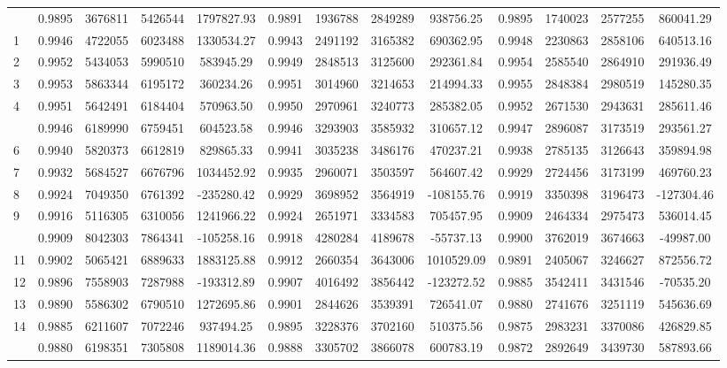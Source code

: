 \documentclass[
  12pt,
]{article}
\begin{document}
\begin{longtable}[t]{lcccccccccccc}
\endfoot
\bottomrule
\endlastfoot
0 & 0.9895 & 3676811 & 5426544 & 1797827.93 & 0.9891 & 1936788 & 2849289 & 938756.25 & 0.9895 & 1740023 & 2577255 & 860041.29\\
1 & 0.9946 & 4722055 & 6023488 & 1330534.27 & 0.9943 & 2491192 & 3165382 & 690362.95 & 0.9948 & 2230863 & 2858106 & 640513.16\\
2 & 0.9952 & 5434053 & 5990510 & 583945.29 & 0.9949 & 2848513 & 3125600 & 292361.84 & 0.9954 & 2585540 & 2864910 & 291936.49\\
3 & 0.9953 & 5863344 & 6195172 & 360234.26 & 0.9951 & 3014960 & 3214653 & 214994.33 & 0.9955 & 2848384 & 2980519 & 145280.35\\
4 & 0.9951 & 5642491 & 6184404 & 570963.50 & 0.9950 & 2970961 & 3240773 & 285382.05 & 0.9952 & 2671530 & 2943631 & 285611.46\\
\addlinespace
5 & 0.9946 & 6189990 & 6759451 & 604523.58 & 0.9946 & 3293903 & 3585932 & 310657.12 & 0.9947 & 2896087 & 3173519 & 293561.27\\
6 & 0.9940 & 5820373 & 6612819 & 829865.33 & 0.9941 & 3035238 & 3486176 & 470237.21 & 0.9938 & 2785135 & 3126643 & 359894.98\\
7 & 0.9932 & 5684527 & 6676796 & 1034452.92 & 0.9935 & 2960071 & 3503597 & 564607.42 & 0.9929 & 2724456 & 3173199 & 469760.23\\
8 & 0.9924 & 7049350 & 6761392 & -235280.42 & 0.9929 & 3698952 & 3564919 & -108155.76 & 0.9919 & 3350398 & 3196473 & -127304.46\\
9 & 0.9916 & 5116305 & 6310056 & 1241966.22 & 0.9924 & 2651971 & 3334583 & 705457.95 & 0.9909 & 2464334 & 2975473 & 536014.45\\
\addlinespace
10 & 0.9909 & 8042303 & 7864341 & -105258.16 & 0.9918 & 4280284 & 4189678 & -55737.13 & 0.9900 & 3762019 & 3674663 & -49987.00\\
11 & 0.9902 & 5065421 & 6889633 & 1883125.88 & 0.9912 & 2660354 & 3643006 & 1010529.09 & 0.9891 & 2405067 & 3246627 & 872556.72\\
12 & 0.9896 & 7558903 & 7287988 & -193312.89 & 0.9907 & 4016492 & 3856442 & -123272.52 & 0.9885 & 3542411 & 3431546 & -70535.20\\
13 & 0.9890 & 5586302 & 6790510 & 1272695.86 & 0.9901 & 2844626 & 3539391 & 726541.07 & 0.9880 & 2741676 & 3251119 & 545636.69\\
14 & 0.9885 & 6211607 & 7072246 & 937494.25 & 0.9895 & 3228376 & 3702160 & 510375.56 & 0.9875 & 2983231 & 3370086 & 426829.85\\
\addlinespace
15 & 0.9880 & 6198351 & 7305808 & 1189014.36 & 0.9888 & 3305702 & 3866078 & 600783.19 & 0.9872 & 2892649 & 3439730 & 587893.66\\

\end{longtable}
\end{document}
